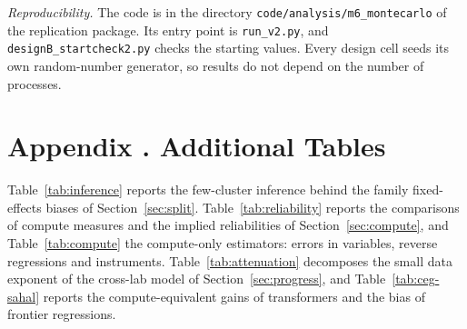 \documentclass[AER,finalmode]{AEA}
\theoremstyle{definition}
\theoremstyle{remark}
\begin{document}


{\sloppy \textit{Reproducibility.} The code is in the directory \texttt{code/analysis/m6\_montecarlo} of the replication
package. Its entry point is \texttt{run\_v2.py}, and \texttt{designB\_startcheck2.py} checks the starting values.
Every design cell seeds its own random-number generator, so results do not depend on the number of processes.\par}

\clearpage
\section[Additional Tables]{Appendix \thesection. Additional Tables}\label{app:tables}

Table~\ref{tab:inference} reports the few-cluster inference behind the family fixed-effects biases of
Section~\ref{sec:split}. Table~\ref{tab:reliability} reports the comparisons of compute measures and the implied
reliabilities of Section~\ref{sec:compute}, and Table~\ref{tab:compute} the compute-only estimators: errors in
variables, reverse regressions and instruments. Table~\ref{tab:attenuation} decomposes the small data exponent of the
cross-lab model of Section~\ref{sec:progress}, and Table~\ref{tab:ceg-sahal} reports the compute-equivalent gains of
transformers and the bias of frontier regressions.






\end{document}

